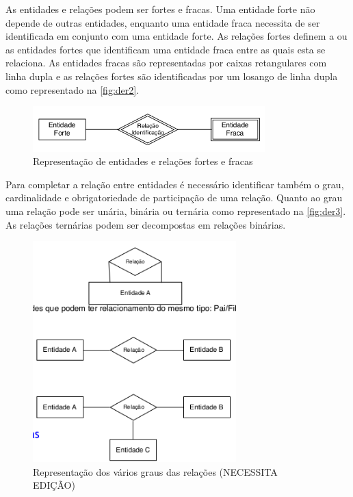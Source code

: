 \documentclass[11pt,twoside,a4paper]{report}
\begin{document}
As entidades e relações podem ser fortes e fracas. Uma entidade forte não depende de outras entidades, enquanto uma entidade fraca necessita de ser identificada em conjunto com uma entidade forte. As relações fortes definem a ou as entidades fortes que identificam uma entidade fraca entre as quais esta se relaciona. As entidades fracas são representadas por caixas retangulares com linha dupla e as relações fortes são identificadas por um losango de linha dupla como representado na \autoref{fig:der2}.
\begin{figure}[H]
	\begin{center}
		\includegraphics[width=0.8\textwidth]{notacao2} %
		\caption{Representação de entidades e relações fortes e fracas}
		\label{fig:der2}
	\end{center}
\end{figure}
\newpage
Para completar a relação entre entidades é necessário identificar também o grau, cardinalidade e obrigatoriedade de participação de uma relação. Quanto ao grau uma relação pode ser unária, binária ou ternária como representado na \autoref{fig:der3}. As relações ternárias podem ser decompostas em relações binárias. %
\begin{figure}[H]
	\begin{center}
		\includegraphics[width=0.7\textwidth]{notacao6} %
		\caption{Representação dos vários graus das relações (NECESSITA EDIÇÃO)}
		\label{fig:der3}
	\end{center}
\end{figure}
\end{document}
